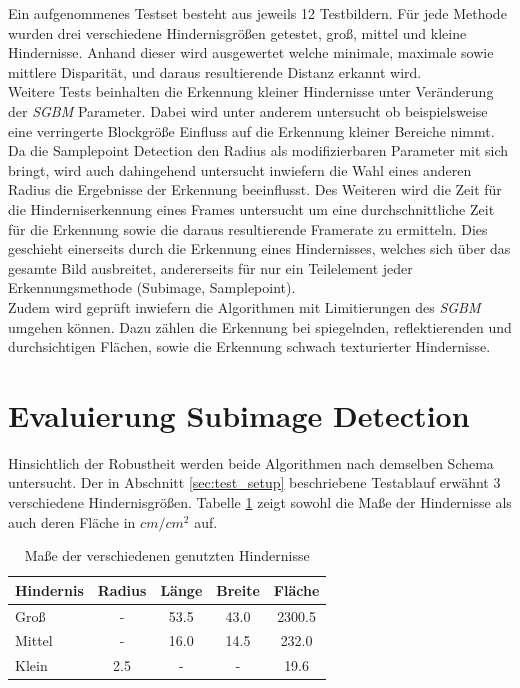 \noindent
Ein aufgenommenes Testset besteht aus jeweils 12 Testbildern. Für jede Methode wurden drei verschiedene Hindernisgrößen getestet, groß, mittel und kleine Hindernisse. Anhand dieser wird ausgewertet welche minimale, maximale sowie mittlere Disparität, und daraus resultierende Distanz erkannt wird.\\

\noindent
Weitere Tests beinhalten die Erkennung kleiner Hindernisse unter Veränderung der \emph{SGBM} Parameter. Dabei wird unter anderem untersucht ob beispielsweise eine verringerte Blockgröße Einfluss auf die Erkennung kleiner Bereiche nimmt. Da die Samplepoint Detection den Radius als modifizierbaren Parameter mit sich bringt, wird auch dahingehend untersucht inwiefern die Wahl eines anderen Radius die Ergebnisse der Erkennung beeinflusst. Des Weiteren wird die Zeit für die Hinderniserkennung eines Frames untersucht um eine durchschnittliche Zeit für die Erkennung sowie die daraus resultierende Framerate zu ermitteln. Dies geschieht einerseits durch die Erkennung eines Hindernisses, welches sich über das gesamte Bild ausbreitet, andererseits für nur ein Teilelement jeder Erkennungsmethode (Subimage, Samplepoint).\\
Zudem wird geprüft inwiefern die Algorithmen mit Limitierungen des \emph{SGBM} umgehen können. Dazu zählen die Erkennung bei spiegelnden, reflektierenden und durchsichtigen Flächen, sowie die Erkennung schwach texturierter Hindernisse.\\


\section{Evaluierung Subimage Detection}
\label{sec:evaluierung_subimage}

Hinsichtlich der Robustheit werden beide Algorithmen nach demselben Schema untersucht. Der in Abschnitt \ref{sec:test_setup} beschriebene Testablauf erwähnt 3 verschiedene Hindernisgrößen. Tabelle \ref{tbl:obstacle_sizes} zeigt sowohl die Maße der Hindernisse als auch deren Fläche in $cm/cm^2$ auf.

\begin{table}[h]
\centering
\begin{tabular}{|l|c|c|c|c|}
\hline
Hindernis   & Radius & Länge & Breite & Fläche \\
\hline
Groß   		&   -    & 53.5  & 43.0   & 2300.5 \\
\hline
Mittel 		& 	-    & 16.0  & 14.5   & 232.0\\
\hline
Klein		&  2.5	 &   -   &   -    & 19.6 \\
\hline	
\end{tabular}
\caption{Maße der verschiedenen genutzten Hindernisse}
\label{tbl:obstacle_sizes}
\end{table}

